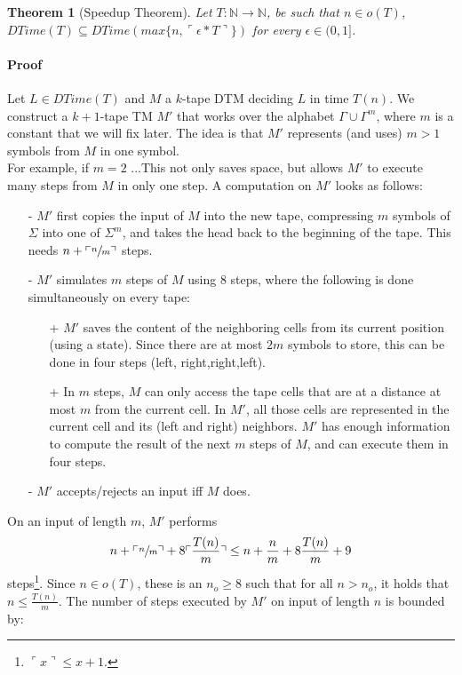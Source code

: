 \documentclass{report}
\newtheorem{theorem}[definition]{Theorem}
\begin{document}
\begin{theorem}[Speedup Theorem]\label{thm:speedup}
Let $T: \mathbb{N} \rightarrow \mathbb{N}$, be such that $n \in o(T)$, $DTime(T) \subseteq DTime(max\{n,\ulcorner \epsilon*T\urcorner\})$ for every $\epsilon \in (0,1]$.
\end{theorem}

\paragraph{Proof} Let $L\in DTime(T)$ and $M$ a $k$-tape DTM deciding $L$ in time $T(n)$. We construct a $k+1$-tape TM $M'$ that works over the alphabet $\Gamma \cup \Gamma^m$, where $m$ is a constant that we will fix later. The idea is that $M'$  represents (and uses) $m>1$ symbols from $M$ in one symbol.\\
For example, if $m=2$ ...This not only saves space, but allows $M'$ to execute many steps from $M$ in only one step. A computation on $M'$ looks as follows:
\begin{itemize}
\item[-] $M'$ first copies the input of $M$ into the new tape, compressing $m$ symbols of $\Sigma$ into one of $\Sigma^m$, and takes the head back to the beginning of the tape. This needs $n+\ulcorner \sfrac{n}{m} \urcorner$ steps.
	\item[-] $M'$ simulates $m$ steps of $M$ using 8 steps, where the following is done simultaneously on every tape:
	\begin{itemize}
		\item[+] $M'$ saves the content of the neighboring cells from its current position (using a state). Since there are at most $2m$ symbols to store, this can be done in four steps (left, right,right,left).
		\item[+] In $m$ steps, $M$ can only access the tape cells that are at a distance at most $m$ from the current cell. In $M'$, all those cells are represented in the current cell and its (left and right) neighbors. $M'$ has enough information to compute the result of the next $m$ steps of $M$, and can execute them in four steps.
	\end{itemize}
	\item[-] $M'$ accepts/rejects an input iff $M$ does.
\end{itemize}
On an input of length $m$, $M'$ performs
\[n+\ulcorner \sfrac{n}{m} \urcorner + 8 \ulcorner\frac{T(n)}{m}\urcorner \leq n + \frac{n}{m} + 8 \frac{T(n)}{m}+9
\]
steps\footnote{$\ulcorner x \urcorner \leq x+1$.}. Since $n \in o(T)$, these is an $n_o \geq 8$ such that for all $n>n_o$, it holds that $n\leq\frac{T(n)}{m}$. The number of steps executed by $M'$ on input of length $n$ is bounded by:
\end{document}
